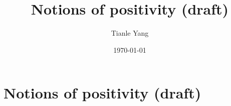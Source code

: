 \documentclass{noteformyself}
\title{Notions of positivity (draft)}
\author{Tianle Yang}
\date{\today}
\begin{document}
    \maketitle

    \section{Notions of positivity (draft)}

    

\end{document}
